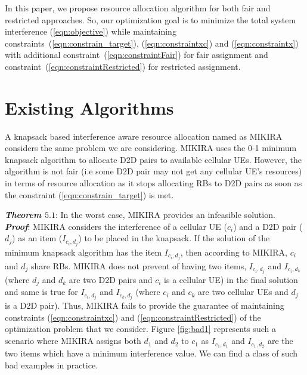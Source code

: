 \documentclass{ieeeaccess}
\begin{document}
\smallskip
 
In this paper, we propose resource allocation algorithm for both fair and restricted approaches. So, our optimization goal is to minimize the total system interference (\ref{eqn:objective}) while maintaining constraints~(\ref{eqn:constrain_target}), (\ref{eqn:constraintxc}) and (\ref{eqn:constraintx}) with additional constraint~(\ref{eqn:constraintFair}) for fair assignment and constraint~(\ref{eqn:constraintRestricted}) for restricted assignment.

\section{Existing Algorithms}\label{existingAlgorithms}
\smallskip
 
A knapsack based interference aware resource allocation named as MIKIRA \cite{islam2015reducing} considers the same problem we are considering. MIKIRA uses the 0-1 minimum knapsack algorithm to allocate D2D pairs to available cellular UEs. However, the algorithm is not fair (i.e some D2D pair may not get any cellular UE's resources) in terms of resource allocation as it stops allocating RBs to D2D pairs as soon as the constraint (\ref{eqn:constrain_target}) is met.

\smallskip
  \textbf{\textit{Theorem $5.1$}}: In the worst case, MIKIRA provides an infeasible solution.\\
 \textbf{\textit{Proof}}: MIKIRA considers the interference of a cellular UE ($c_i$) and a  D2D pair ($d_j$) as an item ($I_{c_i,d_j}$) to be placed in the knapsack. If the solution of the minimum knapsack algorithm has the item $I_{c_i,d_j}$, then according to MIKIRA, $c_i$ and $d_j$ share RBs. MIKIRA does not prevent of having two items, $I_{c_i,d_j}$ and $I_{c_i,d_k}$ (where $d_j$ and $d_k$ are two D2D pairs and $c_i$ is a cellular UE) in the final solution and same is true for $I_{c_i,d_j}$ and $I_{c_k,d_j}$ (where $c_i$ and $c_k$ are two cellular UEs and $d_j$ is a D2D pair). Thus, MIKIRA fails to provide the guarantee of maintaining constraints (\ref{eqn:constraintxc}) and (\ref{eqn:constraintRestricted}) of the optimization problem that we consider.  Figure \ref{fig:bad1} represents such a scenario where MIKIRA assigns both $d_1$ and $d_2$ to $c_1$ as $I_{c_1,d_1}$ and $I_{c_1,d_2}$ are the two items which have a minimum interference value. We can find a class of such bad examples in practice.
\end{document}
